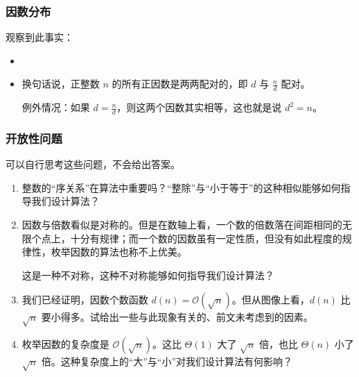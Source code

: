 \begin{frame}
  \frametitle{因数分布}
  观察到此事实：
  \begin{itemize}
    \item {}
    \pause
    \item 换句话说，正整数 $n$ 的所有正因数是\alert{两两配对}的，即 $d$ 与 $\frac{n}{d}$ 配对。
    
    \alert{例外}情况：如果 $d = \frac{n}{d}$，则这两个因数其实相等，这也就是说 $d^2 = n$。
  \end{itemize}
\end{frame}
\begin{frame}
  \frametitle{开放性问题}
  可以自行思考这些问题，不会给出答案。
  \begin{enumerate}
    \item 整数的“\alert{序关系}”在算法中重要吗？“整除”与“小于等于”的这种相似能够如何指导我们设计算法？
    \item 因数与倍数看似是对称的。但是在数轴上看，一个数的倍数落在间距相同的无限个点上，十分有规律；而一个数的因数虽有一定性质，但没有如此程度的规律性，枚举因数的算法也称不上优美。
    
    这是一种\alert{不对称}，这种不对称能够如何指导我们设计算法？
    \item 我们已经证明，因数个数函数 $d(n) = \mathcal O (\sqrt{n})$。但从图像上看，$d(n)$ 比 $\sqrt{n}$ 要小得多。试给出一些与此现象有关的、前文未考虑到的因素。
    \item 枚举因数的复杂度是 $\mathcal O (\sqrt{n})$。这比 $\Theta(1)$ 大了 $\sqrt{n}$ 倍，也比 $\Theta(n)$ 小了 $\sqrt{n}$ 倍。这种复杂度上的“大”与“小”对我们设计算法有何影响？
  \end{enumerate}
\end{frame}
